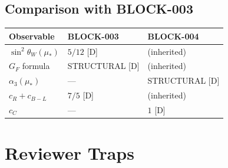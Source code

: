 \documentclass[11pt,a4paper]{article}
\theoremstyle{definition}
\begin{document}
\subsection{Comparison with BLOCK-003}
\label{subsec:comparison-block003}

\begin{canonbox}
\begin{center}
\begin{tabular}{lll}
\toprule
\textbf{Observable} & \textbf{BLOCK-003} & \textbf{BLOCK-004} \\
\midrule
$\sin^2\theta_W(\mu_*)$ & $5/12$ [D] & (inherited) \\
$G_F$ formula & STRUCTURAL [D] & (inherited) \\
$\alpha_3(\mu_*)$ & — & STRUCTURAL [D] \\
$c_R + c_{B-L}$ & $7/5$ [D] & (inherited) \\
$c_C$ & — & $1$ [D] \\
\bottomrule
\end{tabular}
\end{center}
\end{canonbox}

\newpage

\section{Reviewer Traps}
\label{sec:reviewer-traps}
\end{document}
